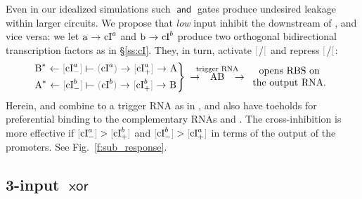 \documentclass[12pt,notitlepage]{article}
\let\cite\citep
\newcommand{\TODO}[1]{\textrm{\color{red}TODO: #1}}
\newcommand{\AND}{\ensuremath{\mathop{\mathsf{and}}}\xspace}
\newcommand{\XOR}{\ensuremath{\mathop{\mathsf{xor}}}\xspace}
\newcommand{\cbra}[1]{{\ensuremath{\color{gray}{#1}}}}
\newcommand{\protein}[1]{{{\cbra{(}\ce{#1}\cbra{)}}}}
\newcommand{\promoter}[1]{{{\cbra{[}\ce{#1}\cbra{]}}}}
\newcommand{\act}{\ {\ensuremath{\mathbin{\to}}}\ }
\newcommand{\rep}{\ {\ensuremath{\mathrel{\raisebox{-.3ex}{\rotatebox{90}{\scalebox{1}[1.2]{$\bot$}}}}}}\ }
\begin{document}
Even in our idealized simulations
such \AND gates produce undesired leakage
within larger circuits.
%
%
%
We propose that
\emph{low} input  
{inhibit} the downstream of ,
and vice versa:
%
we let $\ce{a} \act \ce{cI^a}$
and
$\ce{b} \act \ce{cI^b}$
produce
two orthogonal 
bidirectional
transcription factors as in \S\ref{ss:cI}.
%
They, in turn, 
activate \promoter{cI^a_+}/\promoter{cI^b_+}
and 
repress \promoter{cI^a_-}/\promoter{cI^b_-}:
%
%
\begin{align}
    \begin{rcases*}
        \ce{B^*} \reflectbox{\act} 
        \promoter{cI^a_-} \reflectbox{\rep} \protein{cI^a} \act \promoter{cI^a_+} 
        \act \ce{A}
        \\
        \ce{A^*} \reflectbox{\act} 
        \promoter{cI^b_-} \reflectbox{\rep} \protein{cI^b} \act \promoter{cI^b_+} 
        \act \ce{B}
    \end{rcases*}
    \act 
    \stackrel{\hspace{-10pt}\smash{\text{trigger RNA}}\hspace{-10pt}}{\ce{AB}}
    \act 
    \begin{array}{c}
        \text{opens RBS on} \\ \text{the output RNA.}
    \end{array}
\end{align}
%
%
Herein,
 and  
combine to a trigger RNA  as in
\cite[\href{https://www.nature.com/articles/nature23271/figures/2}{Fig.~2e}]{GreenETAL2017},
and also have toeholds
for preferential binding to 
the complementary RNAs  and .
%
%
The cross-inhibition is more effective
if
$\promoter{cI^a_-} > \promoter{cI^b_+}$
and
$\promoter{cI^b_-} > \promoter{cI^a_+}$
in terms of the output of the promoters.
%
%
See Fig.~\ref{f:sub_response}.





%


\subsection{3-input \texorpdfstring{\XOR}{XOR}} \label{ss:3xor}
\end{document}
